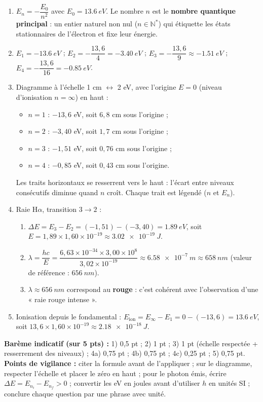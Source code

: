 \documentclass[11pt]{article}
\begin{document}
\begin{corrige}
\begin{enumerate}
\item $E_n = -\dfrac{E_0}{n^2}$ avec $E_0 = \SI{13,6}{eV}$. Le nombre $n$ est le \textbf{nombre quantique principal} : un entier naturel non nul ($n \in \mathbb{N}^*$) qui étiquette les états stationnaires de l'électron et fixe leur énergie.
\item $E_1 = -\SI{13,6}{eV}$ ; $E_2 = -\dfrac{13,6}{4} = \SI{-3,40}{eV}$ ; $E_3 = -\dfrac{13,6}{9} \approx \SI{-1,51}{eV}$ ; $E_4 = -\dfrac{13,6}{16} = \SI{-0,85}{eV}$.
\item Diagramme à l'échelle 1 cm $\leftrightarrow$ 2 eV, avec l'origine $E = 0$ (niveau d'ionisation $n = \infty$) en haut :
\begin{itemize}
\item $n = 1$ : $-13,6$ eV, soit $6,8$ cm sous l'origine ;
\item $n = 2$ : $-3,40$ eV, soit $1,7$ cm sous l'origine ;
\item $n = 3$ : $-1,51$ eV, soit $0,76$ cm sous l'origine ;
\item $n = 4$ : $-0,85$ eV, soit $0,43$ cm sous l'origine.
\end{itemize}
Les traits horizontaux se resserrent vers le haut : l'écart entre niveaux consécutifs diminue quand $n$ croît. Chaque trait est légendé ($n$ et $E_n$).
\item Raie H$\alpha$, transition $3 \to 2$ :
\begin{enumerate}
\item $\Delta E = E_3 - E_2 = (-1,51) - (-3,40) = \SI{1,89}{eV}$, soit $E = 1,89 \times 1,60\times 10^{-19} \approx \SI{3,02e-19}{J}$.
\item $\lambda = \dfrac{hc}{E} = \dfrac{6,63\times 10^{-34}\times 3,00\times 10^{8}}{3,02\times 10^{-19}} \approx \SI{6,58e-7}{m} \approx \SI{658}{nm}$ (valeur de référence : $\SI{656}{nm}$).
\item $\lambda \approx \SI{656}{nm}$ correspond au \textbf{rouge} : c'est cohérent avec l'observation d'une « raie rouge intense ».
\end{enumerate}
\item Ionisation depuis le fondamental : $E_{\text{ion}} = E_\infty - E_1 = 0 - (-13,6) = \SI{13,6}{eV}$, soit $13,6 \times 1,60\times 10^{-19} \approx \SI{2,18e-18}{J}$.
\end{enumerate}
\textbf{Barème indicatif (sur 5 pts) :} 1) 0,5 pt ; 2) 1 pt ; 3) 1 pt (échelle respectée + resserrement des niveaux) ; 4a) 0,75 pt ; 4b) 0,75 pt ; 4c) 0,25 pt ; 5) 0,75 pt.
\textbf{Points de vigilance :} citer la formule avant de l'appliquer ; sur le diagramme, respecter l'échelle et placer le zéro en haut ; pour le photon émis, écrire $\Delta E = E_{n_i} - E_{n_f} > 0$ ; convertir les eV en joules avant d'utiliser $h$ en unités SI ; conclure chaque question par une phrase avec unité.
\end{corrige}
\end{document}
